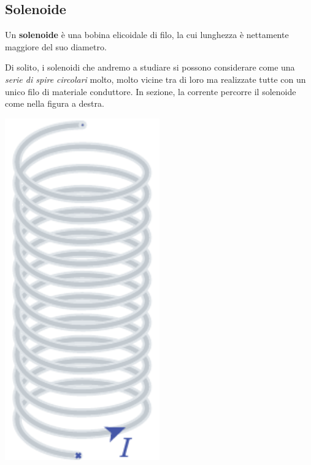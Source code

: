 		\subsection{Solenoide}
		\begin{define}[Solenoide]
			Un \textbf{solenoide} è una bobina elicoidale di filo, la cui lunghezza è nettamente maggiore del suo diametro.
		\end{define}
		Di solito, i solenoidi che andremo a studiare si possono considerare come una \textit{serie di spire circolari} molto, molto vicine tra di loro ma realizzate tutte con un unico filo di materiale conduttore. In sezione, la corrente percorre il solenoide come nella figura a destra.\\
		\begin{minipage}{0.49\textwidth}
			\begin{center}
				\includegraphics[width=0.5\textwidth]{images/chp8/chp8solenoide.pdf}
			\end{center}
		\end{minipage}
